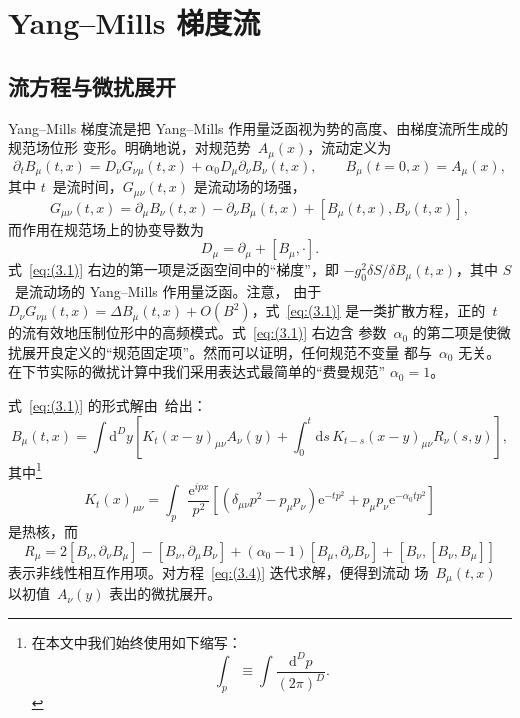 \section{Yang--Mills 梯度流}
\label{sec:3}
\subsection{流方程与微扰展开}
Yang--Mills 梯度流是把 Yang--Mills 作用量泛函视为势的高度、由梯度流所生成的规范场位形
变形。明确地说，对规范势~$A_\mu(x)$，流动定义为~\cite{Luscher:2010iy,Luscher:2011bx}
\begin{equation}
   \partial_tB_\mu(t,x)=D_\nu G_{\nu\mu}(t,x)
   +\alpha_0D_\mu\partial_\nu B_\nu(t,x),\qquad
   B_\mu(t=0,x)=A_\mu(x),
\label{eq:(3.1)}
\end{equation}
其中 $t$~是流时间，$G_{\mu\nu}(t,x)$ 是流动场的场强，
\begin{equation}
   G_{\mu\nu}(t,x)
   =\partial_\mu B_\nu(t,x)-\partial_\nu B_\mu(t,x)
   +[B_\mu(t,x),B_\nu(t,x)],
\label{eq:(3.2)}
\end{equation}
而作用在规范场上的协变导数为
\begin{equation}
   D_\mu=\partial_\mu+[B_\mu,\cdot].
\label{eq:(3.3)}
\end{equation}
式~\eqref{eq:(3.1)} 右边的第一项是泛函空间中的“梯度”，即
$-g_0^2\delta S/\delta B_\mu(t,x)$，其中 $S$~是流动场的 Yang--Mills 作用量泛函。注意，
由于 $D_\nu G_{\nu\mu}(t,x)=\Delta B_\mu(t,x)+O(B^2)$，式~\eqref{eq:(3.1)}
是一类扩散方程，正的~$t$ 的流有效地压制位形中的高频模式。式~\eqref{eq:(3.1)} 右边含
参数~$\alpha_0$ 的第二项是使微扰展开良定义的“规范固定项”。然而可以证明，任何规范不变量
都与~$\alpha_0$ 无关。在下节实际的微扰计算中我们采用表达式最简单的“费曼规范”
$\alpha_0=1$。

式~\eqref{eq:(3.1)} 的形式解由~\cite{Luscher:2010iy,Luscher:2011bx}给出：
\begin{equation}
   B_\mu(t,x)
   =\int\mathrm{d}^Dy\left[
   K_t(x-y)_{\mu\nu}A_\nu(y)
   +\int_0^t\mathrm{d}s\,K_{t-s}(x-y)_{\mu\nu}R_\nu(s,y)
   \right],
\label{eq:(3.4)}
\end{equation}
其中\footnote{在本文中我们始终使用如下缩写：
\begin{equation}
   \int_p\equiv\int\frac{\mathrm{d}^Dp}{(2\pi)^D}.
\label{eq:(3.5)}
\end{equation}
}
\begin{equation}
   K_t(x)_{\mu\nu}=\int_p\frac{\mathrm{e}^{ipx}}{p^2}
   \left[(\delta_{\mu\nu}p^2-p_\mu p_\nu)\mathrm{e}^{-tp^2}
   +p_\mu p_\nu \mathrm{e}^{-\alpha_0tp^2}\right]
\label{eq:(3.6)}
\end{equation}
是热核，而
\begin{equation}
   R_\mu=2[B_\nu,\partial_\nu B_\mu]
   -[B_\nu,\partial_\mu B_\nu]
   +(\alpha_0-1)[B_\mu,\partial_\nu B_\nu]
   +[B_\nu,[B_\nu,B_\mu]]
\label{eq:(3.7)}
\end{equation}
表示非线性相互作用项。对方程~\eqref{eq:(3.4)} 迭代求解，便得到流动
场~$B_\mu(t,x)$ 以初值~$A_\nu(y)$ 表出的微扰展开。

